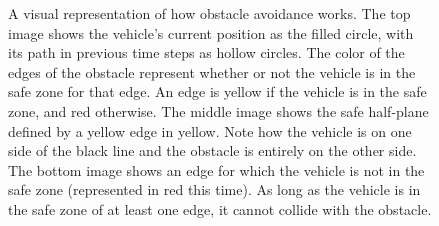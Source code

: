 \begin{figure}[!t]
    \centering
    \hfil
     \hfil
    \caption{A visual representation of how obstacle avoidance works. The top image shows the vehicle's current position as the filled circle, with its path in previous time steps as hollow circles. The color of the edges of the obstacle represent whether or not the vehicle is in the safe zone for that edge. An edge is yellow if the vehicle is in the safe zone, and red otherwise. The middle image shows the safe half-plane defined by a yellow edge in yellow. Note how the vehicle is on one side of the black line and the obstacle is entirely on the other side. The bottom image shows an edge for which the vehicle is not in the safe zone (represented in red this time). As long as the vehicle is in the safe zone of at least one edge, it cannot collide with the obstacle.}\label{fig:obs}
\end{figure}
